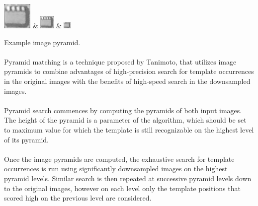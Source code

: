 \begin{table}[h!]
	\centering
	\includegraphics[width=.25\textwidth]{TemplateMatching/img/board_template_pyramid_0} &
	\includegraphics[width=.25\textwidth]{TemplateMatching/img/board_template_pyramid_1} &
	\includegraphics[width=.25\textwidth]{TemplateMatching/img/board_template_pyramid_2}	

	\endtabular
	\caption{Example image pyramid.}
	\label{fig:TemplatePyramid}
\end{table}

\paragraph*{}
Pyramid matching is a technique proposed\cite{Tanimoto81} by Tanimoto, that utilizes image pyramids to combine advantages of high-precision search for template occurrences in the original images with the benefits of high-speed search in the downsampled images. 

\paragraph*{}
Pyramid search commences by computing the pyramids of both input images. The height of the pyramid is a parameter of the algorithm, which should be set to maximum value for which the template is still recognizable on the highest level of its pyramid.

\paragraph*{}
Once the image pyramids are computed, the exhaustive search for template occurrences is run using significantly downsampled images on the highest pyramid levels. Similar search is then repeated at successive pyramid levels down to the original images, however on each level only the template positions that scored high on the previous level are considered.

